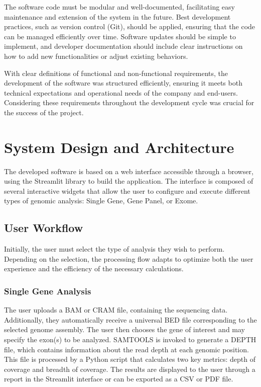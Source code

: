 The software code must be modular and well-documented, facilitating easy maintenance and extension of the system in the future. Best development practices, such as version control (Git), should be applied, ensuring that the code can be managed efficiently over time. Software updates should be simple to implement, and developer documentation should include clear instructions on how to add new functionalities or adjust existing behaviors.

With clear definitions of functional and non-functional requirements, the development of the software was structured efficiently, ensuring it meets both technical expectations and operational needs of the company and end-users. Considering these requirements throughout the development cycle was crucial for the success of the project.



\section{System Design and Architecture}

The developed software is based on a web interface accessible through a browser, using the Streamlit library to build the application. The interface is composed of several interactive widgets that allow the user to configure and execute different types of genomic analysis: Single Gene, Gene Panel, or Exome.

\subsection{User Workflow}

Initially, the user must select the type of analysis they wish to perform. Depending on the selection, the processing flow adapts to optimize both the user experience and the efficiency of the necessary calculations.

\subsubsection{\textbf{Single Gene Analysis}}

The user uploads a BAM or CRAM file, containing the sequencing data. Additionally, they automatically receive a universal BED file corresponding to the selected genome assembly. The user then chooses the gene of interest and may specify the exon(s) to be analyzed. SAMTOOLS is invoked to generate a DEPTH file, which contains information about the read depth at each genomic position. This file is processed by a Python script that calculates two key metrics: depth of coverage and breadth of coverage. The results are displayed to the user through a report in the Streamlit interface or can be exported as a CSV or PDF file.

